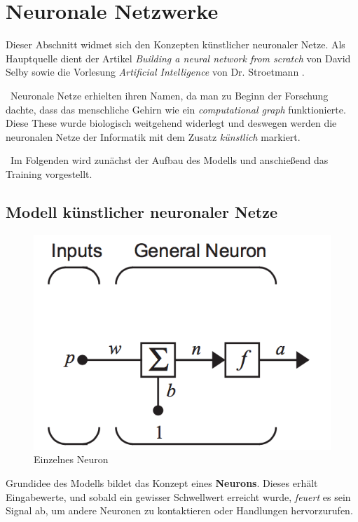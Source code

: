 \newpage
\section{Neuronale Netzwerke}
\label{sec:NN}
Dieser Abschnitt widmet sich den Konzepten künstlicher neuronaler Netze. Als Hauptquelle dient der Artikel \textit{Building a neural network from scratch} von David Selby \cite{SelbyNN} sowie die Vorlesung \textit{Artificial Intelligence} von Dr. Stroetmann \cite{stroetmann}.

~\newline Neuronale Netze erhielten ihren Namen, da man zu Beginn der Forschung dachte, dass das menschliche Gehirn wie ein \textit{computational graph} funktionierte. Diese These wurde biologisch weitgehend widerlegt und deswegen werden die neuronalen Netze der Informatik mit dem Zusatz \textit{künstlich} markiert. 

~\newline Im Folgenden wird zunächst der Aufbau des Modells und anschießend das Training vorgestellt.
\subsection{Modell künstlicher neuronaler Netze}
\begin{figure}[h]
	\begin{center}
		\includegraphics[width=0.4\linewidth]{Bilder/singleNeuron}
		\caption[Einzelnes Neuron: \url{
			http://caisplusplus.usc.edu/blog/curriculum/lesson4}]{Einzelnes Neuron}
		\label{fig:Neuron}
	\end{center}
\end{figure}

Grundidee des Modells bildet das Konzept eines \textbf{Neurons}. Dieses erhält Eingabewerte, und sobald ein gewisser Schwellwert erreicht wurde, \textit{feuert} es sein Signal ab, um andere Neuronen zu kontaktieren oder Handlungen hervorzurufen. 

